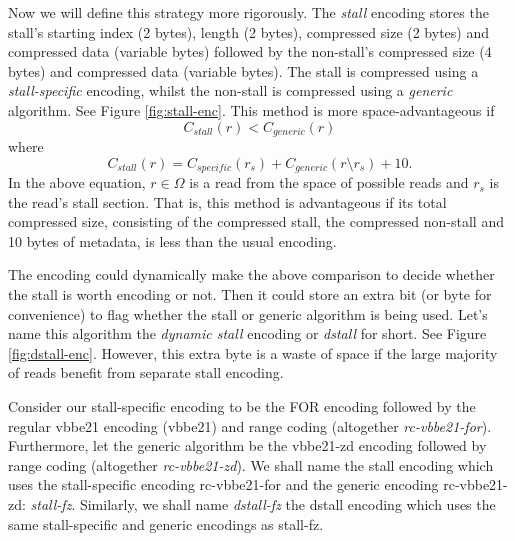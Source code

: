 Now we will define this strategy more rigorously. The \textit{stall} encoding
stores the stall's starting index (2 bytes), length (2 bytes), compressed size
(2 bytes) and compressed data (variable bytes) followed by the non-stall's
compressed size (4 bytes) and compressed data (variable bytes). The stall is
compressed using a \textit{stall-specific} encoding, whilst the non-stall is
compressed using a \textit{generic} algorithm.  See Figure \ref{fig:stall-enc}.
This method is more space-advantageous if
\[ C_{stall}(r) < C_{generic}(r) \]
where
\[ C_{stall}(r) = C_{specific}(r_s) + C_{generic}(r\setminus r_s) + 10. \]
In the above equation, $r\in\Omega$ is a read from the space of possible reads and $r_s$ is the
read's stall section. That is, this method is advantageous if its total
compressed size, consisting of the compressed stall, the compressed non-stall
and 10 bytes of metadata, is less than the usual encoding.



The encoding could dynamically make the above comparison to decide
whether the stall is worth encoding or not. Then it could store an extra bit (or
byte for convenience) to flag whether the stall or generic algorithm is being
used. Let's name this algorithm the \textit{dynamic stall} encoding or
\textit{dstall} for short. See Figure \ref{fig:dstall-enc}. However, this extra
byte is a waste of space if the large majority of reads benefit from separate
stall encoding.



Consider our stall-specific encoding to be the FOR encoding followed by the
regular vbbe21 encoding (vbbe21) and range coding (altogether
\textit{rc-vbbe21-for}). Furthermore, let the generic algorithm be the
vbbe21-zd encoding followed by range coding (altogether
\textit{rc-vbbe21-zd}).
We shall name the stall encoding which uses the stall-specific encoding
rc-vbbe21-for and the generic encoding rc-vbbe21-zd: \textit{stall-fz}.
Similarly, we shall name \textit{dstall-fz} the dstall encoding which uses the
same stall-specific and generic encodings as stall-fz.

